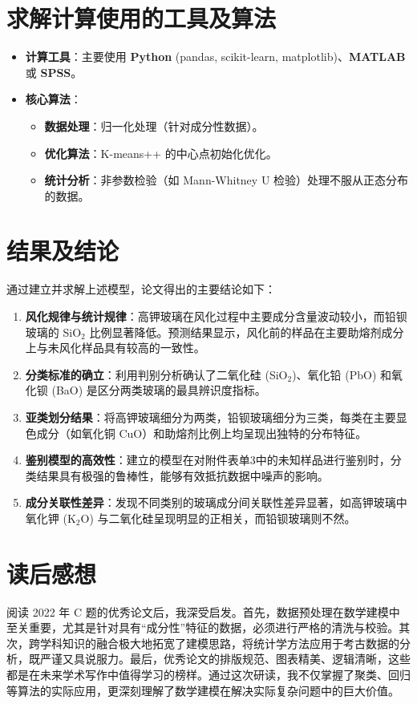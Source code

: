 \documentclass[UTF8, zihao=-4]{ctexart}
\begin{document}
\section{求解计算使用的工具及算法}
\begin{itemize}
    \item \textbf{计算工具}：主要使用 \textbf{Python} (pandas, scikit-learn, matplotlib)、\textbf{MATLAB} 或 \textbf{SPSS}。
    \item \textbf{核心算法}：
    \begin{itemize}
        \item \textbf{数据处理}：归一化处理（针对成分性数据）。
        \item \textbf{优化算法}：K-means++ 的中心点初始化优化。
        \item \textbf{统计分析}：非参数检验（如 Mann-Whitney U 检验）处理不服从正态分布的数据。
    \end{itemize}
\end{itemize}

\section{结果及结论}
通过建立并求解上述模型，论文得出的主要结论如下：
\begin{enumerate}
    \item \textbf{风化规律与统计规律}：高钾玻璃在风化过程中主要成分含量波动较小，而铅钡玻璃的 SiO$_2$ 比例显著降低。预测结果显示，风化前的样品在主要助熔剂成分上与未风化样品具有较高的一致性。
    \item \textbf{分类标准的确立}：利用判别分析确认了二氧化硅 (SiO$_2$)、氧化铅 (PbO) 和氧化钡 (BaO) 是区分两类玻璃的最具辨识度指标。
    \item \textbf{亚类划分结果}：将高钾玻璃细分为两类，铅钡玻璃细分为三类，每类在主要显色成分（如氧化铜 CuO）和助熔剂比例上均呈现出独特的分布特征。
    \item \textbf{鉴别模型的高效性}：建立的模型在对附件表单3中的未知样品进行鉴别时，分类结果具有极强的鲁棒性，能够有效抵抗数据中噪声的影响。
    \item \textbf{成分关联性差异}：发现不同类别的玻璃成分间关联性差异显著，如高钾玻璃中氧化钾 (K$_2$O) 与二氧化硅呈现明显的正相关，而铅钡玻璃则不然。
\end{enumerate}

\section{读后感想}
阅读 2022 年 C 题的优秀论文后，我深受启发。首先，数据预处理在数学建模中至关重要，尤其是针对具有“成分性”特征的数据，必须进行严格的清洗与校验。其次，跨学科知识的融合极大地拓宽了建模思路，将统计学方法应用于考古数据的分析，既严谨又具说服力。最后，优秀论文的排版规范、图表精美、逻辑清晰，这些都是在未来学术写作中值得学习的榜样。通过这次研读，我不仅掌握了聚类、回归等算法的实际应用，更深刻理解了数学建模在解决实际复杂问题中的巨大价值。
\end{document}
